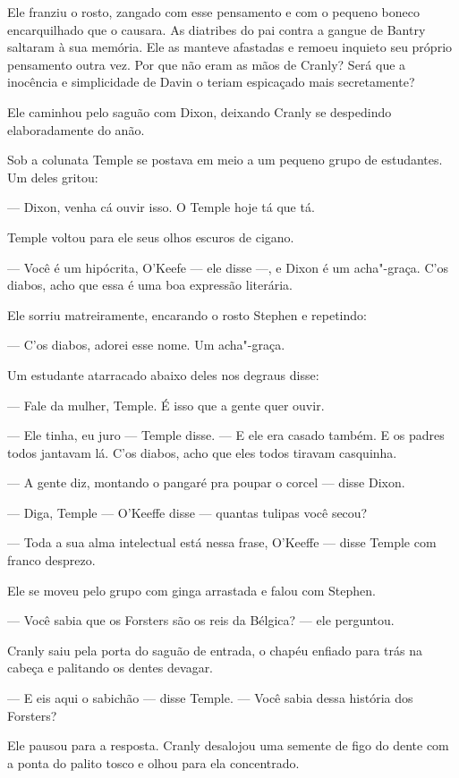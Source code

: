Ele franziu o rosto, zangado com esse pensamento e com o pequeno boneco
encarquilhado que o causara. As diatribes do pai contra a gangue de
Bantry saltaram à sua memória. Ele as manteve afastadas e remoeu
inquieto seu próprio pensamento outra vez. Por que não eram as mãos de
Cranly? Será que a inocência e simplicidade de Davin o teriam
espicaçado mais secretamente?

Ele caminhou pelo saguão com Dixon, deixando Cranly se despedindo
elaboradamente do anão.


\bigskip

Sob a colunata Temple se postava em meio a um pequeno grupo de
estudantes. Um deles gritou:

 --- Dixon, venha cá ouvir isso. O Temple hoje tá que tá. 

Temple voltou para ele seus olhos escuros de cigano.

 --- Você é um hipócrita, O’Keefe --- ele disse ---, e Dixon é um
acha"-graça. C’os diabos, acho que essa é uma boa        
expressão literária.

Ele sorriu matreiramente, encarando o rosto Stephen e repetindo:

 --- C’os diabos, adorei esse nome. Um acha"-graça.      

Um estudante atarracado abaixo deles nos degraus disse:

 --- Fale da mulher, Temple. É isso que a gente quer ouvir.

 --- Ele tinha, eu juro --- Temple disse. --- E ele era casado também. E os padres
todos jantavam lá. C’os diabos, acho que eles todos
tiravam casquinha.

 --- A gente diz, montando o pangaré pra poupar o corcel --- disse Dixon.

 --- Diga, Temple --- O’Keeffe disse --- quantas tulipas você  
secou?

 --- Toda a sua alma intelectual está nessa frase,
O’Keeffe --- disse Temple com franco desprezo.

Ele se moveu pelo grupo com ginga arrastada e falou com Stephen.

 --- Você sabia que os Forsters são os reis da Bélgica? --- ele perguntou.

Cranly saiu pela porta do saguão de entrada, o chapéu enfiado para trás
na cabeça e palitando os dentes devagar.

 --- E eis aqui o sabichão --- disse Temple. --- Você sabia dessa história dos
Forsters?

Ele pausou para a resposta. Cranly desalojou uma semente de figo do
dente com a ponta do palito tosco e olhou para ela concentrado.


